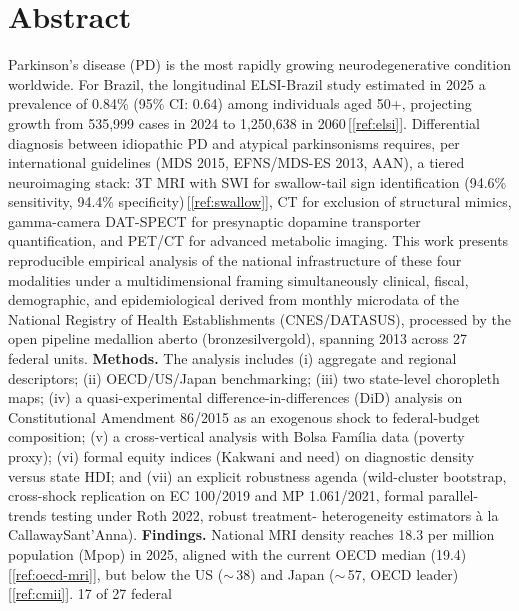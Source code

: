 \documentclass[12pt,a4paper,oneside]{article}
\begin{document}
\section*{Abstract}
\begin{singlespace}\small\noindent
Parkinson's disease (PD) is the most rapidly growing
neurodegenerative condition worldwide. For Brazil, the longitudinal
ELSI-Brazil study estimated in 2025 a prevalence of 0.84\%
(95\% CI: 0.64) among individuals aged 50+,
projecting growth from 535,999 cases in 2024 to 1,250,638 in
2060\,[\ref{ref:elsi}]. Differential diagnosis between idiopathic PD
and atypical parkinsonisms requires, per international guidelines
(MDS 2015, EFNS/MDS-ES 2013, AAN), a tiered neuroimaging stack:
3T MRI with SWI for swallow-tail sign identification (94.6\%
sensitivity, 94.4\% specificity)\,[\ref{ref:swallow}], CT for
exclusion of structural mimics, gamma-camera DAT-SPECT for
presynaptic dopamine transporter quantification, and PET/CT for
advanced metabolic imaging. This work presents reproducible empirical
analysis of the national infrastructure of these four modalities
under a multidimensional framing \textemdash{} simultaneously
clinical, fiscal, demographic, and epidemiological \textemdash{}
derived from monthly microdata of the National Registry of Health
Establishments (CNES/DATASUS), processed by the open
pipeline medallion aberto
(bronze\textrightarrow silver\textrightarrow gold), spanning
2013 across 27 federal units. \textbf{Methods.}
The analysis includes (i) aggregate and regional descriptors;
(ii) OECD/US/Japan benchmarking; (iii) two state-level choropleth
maps; (iv) a quasi-experimental difference-in-differences (DiD)
analysis on Constitutional Amendment 86/2015 as an exogenous shock
to federal-budget composition; (v) a cross-vertical analysis with
Bolsa Família data (poverty proxy); (vi) formal equity indices
(Kakwani and need) on diagnostic density versus state HDI; and
(vii) an explicit robustness agenda (wild-cluster bootstrap,
cross-shock replication on EC 100/2019 and MP 1.061/2021, formal
parallel-trends testing under Roth 2022, robust treatment-
heterogeneity estimators à la Callaway\textendash Sant'Anna).
\textbf{Findings.} National MRI density reaches 18.3 per million
population (Mpop) in 2025, aligned with the current OECD median
(19.4)\,[\ref{ref:oecd-mri}], but below the US ($\sim$\,38) and
Japan ($\sim$\,57, OECD leader)\,[\ref{ref:cmii}]. 17 of 27 federal

\end{singlespace}
\end{document}
